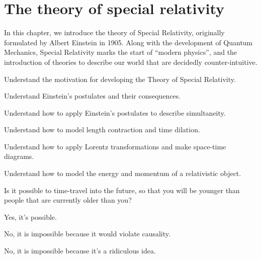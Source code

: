 \chapter{The theory of special relativity}
\label{chap:specialrelativity}
In this chapter, we introduce the theory of Special Relativity, originally formulated by Albert Einstein in 1905. Along with the development of Quantum Mechanics, Special Relativity marks the start of ``modern physics'', and the introduction of theories to describe our world that are decidedly counter-intuitive. 
 \vspace{1cm}
\begin{learningObjectives}
{
\item Understand the motivation for developing the Theory of Special Relativity.
\item Understand Einstein's postulates and their consequences.
\item Understand how to apply Einstein's postulates to describe simultaneity.
\item Understand how to model length contraction and time dilation.
\item Understand how to apply Lorentz transformations and make space-time diagrams.
\item Understand how to model the energy and momentum of a relativistic object.
}
\end{learningObjectives}

\begin{opening}
\begin{MCquestion}{Is it possible to time-travel into the future, so that you will be younger than people that are currently older than you?}
\item Yes, it's possible. \correct
\item No, it is impossible because it would violate causality.
\item No, it is impossible because it's a ridiculous idea.
\end{MCquestion}
\end{opening}

